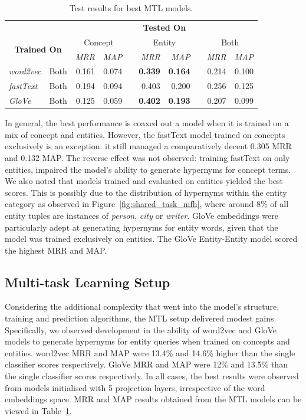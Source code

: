 \begin{table}\centering
\begin{tabular}{@{}llrrcrrcrr@{}}\toprule
& & \multicolumn{8}{c}{\textbf{Tested On}}\\ 
\cmidrule{3-10}
\multicolumn{2}{c}{\multirow[c]{2}{*}{\textbf{Trained On}}} & \multicolumn{2}{c}{Concept} & \phantom{a} & \multicolumn{2}{c}{Entity} & \phantom{a} & \multicolumn{2}{c}{Both}\\ 
\multicolumn{2}{c}{} & \textit{MRR} & \textit{MAP} && \textit{MRR} & \textit{MAP} && \textit{MRR} & \textit{MAP}\\
\cmidrule{3-4} \cmidrule{6-7} \cmidrule{9-10}  
\textit{word2vec} & Both & 0.161 & 0.074 && \textbf{0.339} & \textbf{0.164} && 0.214 & 0.100 \\ 
\textit{fastText} & Both & 0.194 & 0.094 && 0.403 & 0.200 && 0.256 & 0.125\\ 
\textit{GloVe} & Both & 0.125 & 0.059 && \textbf{0.402} & \textbf{0.193} && 0.207 & 0.099\\ 
\bottomrule
\end{tabular}
\caption{Test results for best MTL models.}\label{tab:semeval_mtl}
\end{table}

In general, the best performance is coaxed out a model when it is trained on a mix of concept and entities.  However, the fastText model trained on concepts exclusively is an exception: it still managed a comparatively decent 0.305 \ac{MRR} and 0.132 \ac{MAP}.  The reverse effect was not observed: training fastText on only entities, impaired the model's ability to generate hypernyms for concept terms.  We also noted that models trained and evaluated on entities yielded the best scores.  This is possibly due to the distribution of hypernyms within the entity category as observed in Figure~\ref{fig:shared_task_mfh}, where around 8\% of all entity tuples are instances of \textit{person}, \textit{city} or \textit{writer}.  GloVe embeddings were particularly adept at generating hypernyms for entity words, given that the model was trained exclusively on entities.  The GloVe Entity-Entity model scored the highest \ac{MRR} and \ac{MAP}.

\subsection{Multi-task Learning Setup}
Considering the additional complexity that went into the model's structure, training and prediction algorithms, the \ac{MTL} setup delivered modest gains.  Specifically, we observed development in the ability of word2vec and GloVe models to generate hypernyms for entity queries when trained on concepts and entities.  word2vec \ac{MRR} and \ac{MAP} were 13.4\%  and 14.6\% higher than the single classifier scores respectively.  GloVe \ac{MRR} and \ac{MAP} were 12\% and 13.5\% than the single classifier scores respectively.  In all cases, the best results were observed from models initialised with 5 projection layers, irrespective of the word embeddings space.  \ac{MRR} and \ac{MAP} results obtained from the \ac{MTL} models can be viewed in Table~\ref{tab:semeval_mtl}.

